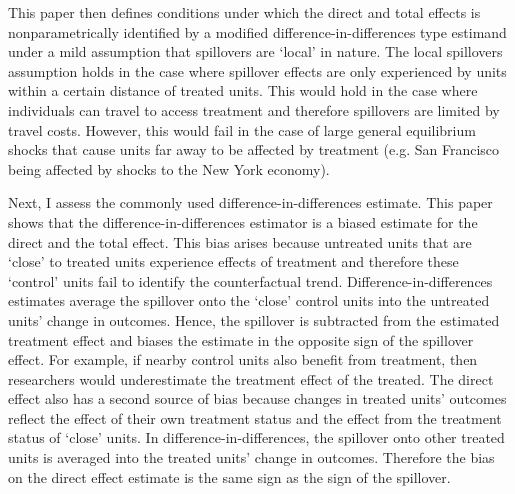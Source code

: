 \documentclass[11pt]{article}
\begin{document}
This paper then defines conditions under which the direct and total effects is nonparametrically identified by a modified difference-in-differences type estimand under a mild assumption that spillovers are `local' in nature. The local spillovers assumption holds in the case where spillover effects are only experienced by units within a certain distance of treated units. This would hold in the case where individuals can travel to access treatment and therefore spillovers are limited by travel costs. However, this would fail in the case of large general equilibrium shocks that cause units far away to be affected by treatment (e.g. San Francisco being affected by shocks to the New York economy).

Next, I assess the commonly used difference-in-differences estimate. This paper shows that the difference-in-differences estimator is a biased estimate for the direct and the total effect. This bias arises because untreated units that are `close' to treated units experience effects of treatment and therefore these `control' units fail to identify the counterfactual trend. Difference-in-differences estimates average the spillover onto the `close' control units into the untreated units' change in outcomes. Hence, the spillover is subtracted from the estimated treatment effect and biases the estimate in the opposite sign of the spillover effect. For example, if nearby control units also benefit from treatment, then researchers would underestimate the treatment effect of the treated. The direct effect also has a second source of bias because changes in treated units' outcomes reflect the effect of their own treatment status and the effect from the treatment status of `close' units. In difference-in-differences, the spillover onto other treated units is averaged into the treated units' change in outcomes. Therefore the bias on the direct effect estimate is the same sign as the sign of the spillover. 
\end{document}
